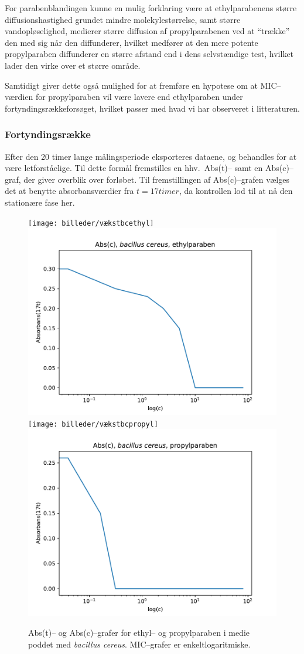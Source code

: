     For parabenblandingen kunne en mulig forklaring være at ethylparabenens større diffusionshastighed grundet mindre molekylestørrelse, samt større vandopløselighed, medierer større diffusion af propylparabenen ved at ``trække'' den med sig når den diffunderer, hvilket medfører at den mere potente propylparaben diffunderer en større afstand end i dens selvstændige test, hvilket lader den virke over et større område.
    
    Samtidigt giver dette også mulighed for at fremføre en hypotese om at MIC--værdien for propylparaben vil være lavere end ethylparaben under fortyndingsrækkeforsøget, hvilket passer med hvad vi har observeret i litteraturen.

    \subsubsection{Fortyndingsrække}
    Efter den 20 timer lange målingsperiode eksporteres dataene, og behandles for at være letforståelige. Til dette formål fremstilles en hhv.\ Abs(t)-- samt en Abs(c)--graf, der giver overblik over forløbet. Til fremstillingen af Abs(c)--grafen vælges det at benytte absorbansværdier fra $t=17\si{timer}$, da kontrollen lod til at nå den stationære fase her.
    \begin{figure}[H]\centering
        \texttt{[image: billeder/vækstbcethyl]}
        \includegraphics[width=.49\linewidth]{billeder/micbcethyl}
        \texttt{[image: billeder/vækstbcpropyl]}
        \includegraphics[width=.49\linewidth]{billeder/micbcpropyl}
        \caption{Abs(t)-- og Abs(c)--grafer for ethyl-- og propylparaben i medie poddet med \textit{bacillus cereus}. MIC--grafer er enkeltlogaritmiske.}
    \end{figure}
